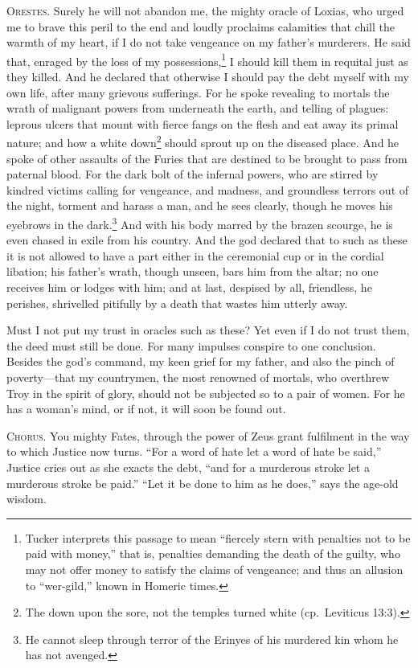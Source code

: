 \documentclass[12pt]{article}
\begin{document}
\textsc{Orestes.} Surely he will not abandon me, the mighty oracle of Loxias, who urged me to brave this peril to the end and loudly proclaims calamities that chill the warmth of my heart, if I do not take vengeance on my father's murderers. He said that, enraged by the loss of my possessions,\footnote{Tucker interprets this passage to mean ``fiercely stern with penalties not to be paid with money,'' that is, penalties demanding the death of the guilty, who may not offer money to satisfy the claims of vengeance; and thus an allusion to ``wer-gild,'' known in Homeric times.} I should kill them in requital just as they killed. And he declared that otherwise I should pay the debt myself with my own life, after many grievous sufferings. For he spoke revealing to mortals the wrath of malignant powers from underneath the earth, and telling of plagues: leprous ulcers that mount with fierce fangs on the flesh and eat away its primal nature; and how a white down\footnote{The down upon the sore, not the temples turned white (cp.~Leviticus 13:3).} should sprout up on the diseased place. And he spoke of other assaults of the Furies that are destined to be brought to pass from paternal blood. For the dark bolt of the infernal powers, who are stirred by kindred victims calling for vengeance, and madness, and groundless terrors out of the night, torment and harass a man, and he sees clearly, though he moves his eyebrows in the dark.\footnote{He cannot sleep through terror of the Erinyes of his murdered kin whom he has not avenged.} And with his body marred by the brazen scourge, he is even chased in exile from his country. And the god declared that to such as these it is not allowed to have a part either in the ceremonial cup or in the cordial libation; his father's wrath, though unseen, bars him from the altar; no one receives him or lodges with him; and at last, despised by all, friendless, he perishes, shrivelled pitifully by a death that wastes him utterly away.

Must I not put my trust in oracles such as these? Yet even if I do not trust them, the deed must still be done. For many impulses conspire to one conclusion. Besides the god's command, my keen grief for my father, and also the pinch of poverty---that my countrymen, the most renowned of mortals, who overthrew Troy in the spirit of glory, should not be subjected so to a pair of women. For he has a woman's mind, or if not, it will soon be found out.

\textsc{Chorus.} You mighty Fates, through the power of Zeus grant fulfilment in the way to which Justice now turns. ``For a word of hate let a word of hate be said,'' Justice cries out as she exacts the debt, ``and for a murderous stroke let a murderous stroke be paid.'' ``Let it be done to him as he does,'' says the age-old wisdom.
\end{document}
